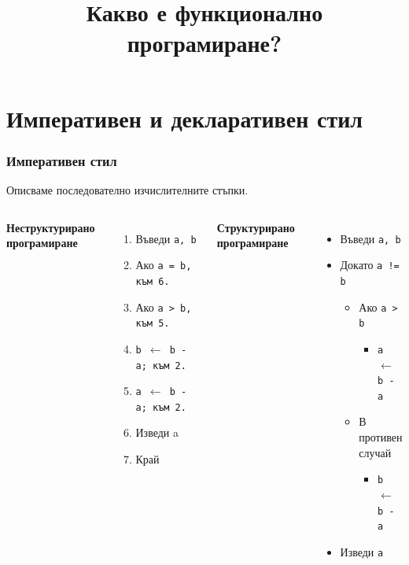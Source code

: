 \documentclass{beamer}
\title{Какво е функционално програмиране?}
\begin{document}
\begin{frame}
  \titlepage
\end{frame}

\section*{Императивен и декларативен стил}

\begin{frame}
  \frametitle{Императивен стил}

  Описваме последователно изчислителните стъпки.

  \begin{columns}[t,onlytextwidth]

    \textbf{Неструктурирано програмиране}

    \begin{enumerate}
    \item Въведи \tt a, \tt b
    \item Ако \tt{a = b}, към 6.
    \item Ако \tt{a > b}, към 5.
    \item \tt{b $\leftarrow$ b - a}; към 2.
    \item \tt{a $\leftarrow$ b - a}; към 2.
    \item Изведи a
    \item Край
    \end{enumerate}


    \textbf{Структурирано програмиране}

    \begin{itemize}
    \item Въведи \tt a, \tt b
    \item Докато \tt{a != b}
      \begin{itemize}
      \item Ако \tt{a > b}
        \begin{itemize}
        \item \tt{a $\leftarrow$ b - a}
        \end{itemize}
      \item В противен случай
        \begin{itemize}
        \item \tt{b $\leftarrow$ b - a}
        \end{itemize}        
      \end{itemize}
    \item Изведи \tt a
    \end{itemize}

  \end{columns}
\end{frame}
\end{document}

